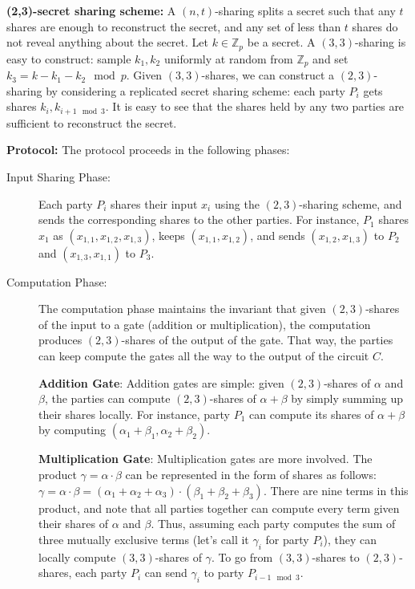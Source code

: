 \noindent\textbf{(2,3)-secret sharing scheme:}
A $(n,t)$-sharing splits a secret such that any $t$ shares are enough to reconstruct the secret, and any set of less than $t$ shares do not reveal anything about the secret.
Let $k \in \mathbb{Z}_p$ be a secret. A $(3,3)$-sharing is easy to construct: sample $k_1, k_2$ uniformly at random from $\mathbb{Z}_p$ and set $k_3 = k - k_1 - k_2 \mod p$.
Given $(3,3)$-shares, we can construct a $(2,3)$-sharing by considering a replicated secret sharing scheme: each party $P_i$ gets shares $k_i, k_{i+1 \mod 3}$. It is easy to see that the shares held by any two parties are sufficient to reconstruct the secret.

\noindent\textbf{Protocol:}
The protocol proceeds in the following phases:
\begin{description}
  \item[Input Sharing Phase:] 
  Each party $P_i$ shares their input $x_i$ using the $(2,3)$-sharing scheme, and sends the corresponding shares to the other parties.
  For instance, $P_1$ shares $x_1$ as $(x_{1,1}, x_{1,2}, x_{1,3})$, keeps $(x_{1,1}, x_{1,2})$, and sends $(x_{1,2}, x_{1,3})$ to $P_2$ and $(x_{1,3}, x_{1,1})$ to $P_3$.
  \item[Computation Phase:] 
  The computation phase maintains the invariant that given $(2,3)$-shares of the input to a gate (addition or multiplication), the computation produces $(2,3)$-shares of the output of the gate. That way, the parties can keep compute the gates all the way to the output of the circuit $C$.

  \textbf{Addition Gate}:
  Addition gates are simple: given $(2,3)$-shares of $\alpha$ and $\beta$, the parties can compute $(2,3)$-shares of $\alpha + \beta$ by simply summing up their shares locally.
  For instance, party $P_1$ can compute its shares of $\alpha+\beta$ by computing $(\alpha_1 + \beta_1, \alpha_2 + \beta_2)$. 

  \textbf{Multiplication Gate}:
  Multiplication gates are more involved. The product $\gamma = \alpha \cdot \beta$ can be represented in the form of shares as follows: $\gamma = \alpha \cdot \beta = (\alpha_1 + \alpha_2 + \alpha_3) \cdot (\beta_1 + \beta_2 + \beta_3)$.
  There are nine terms in this product, and note that all parties together can compute every term given their shares of $\alpha$ and $\beta$. 
  Thus, assuming each party computes the sum of three mutually exclusive terms (let's call it $\gamma_i$ for party $P_i$), they can locally compute $(3,3)$-shares of $\gamma$.
  To go from $(3,3)$-shares to $(2,3)$-shares, each party $P_i$ can send $\gamma_i$ to party $P_{i-1 \mod 3}$.


\end{description}
